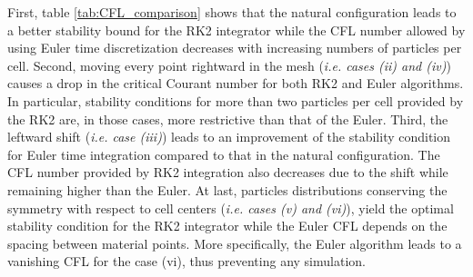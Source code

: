 First, table \ref{tab:CFL_comparison} shows that the natural configuration leads to a better stability bound for the RK2 integrator while the CFL number allowed by using Euler time discretization decreases with increasing numbers of particles per cell.
Second, moving every point rightward in the mesh (\textit{i.e. cases (ii) and (iv)}) causes a drop in the critical Courant number for both RK2 and Euler algorithms. In particular, stability conditions for more than two particles per cell provided by the RK2 are, in those cases, more restrictive than that of the Euler.
Third, the leftward shift (\textit{i.e. case (iii)}) leads to an improvement of the stability condition for Euler time integration compared to that in the natural configuration.
The CFL number provided by RK2 integration also decreases due to the shift while remaining higher than the Euler.
At last, particles distributions conserving the symmetry with respect to cell centers (\textit{i.e. cases (v) and (vi)}), yield the optimal stability condition for the RK2 integrator while the Euler CFL depends on the spacing between material points.
More specifically, the Euler algorithm leads to a vanishing CFL for the case (vi), thus preventing any simulation.


